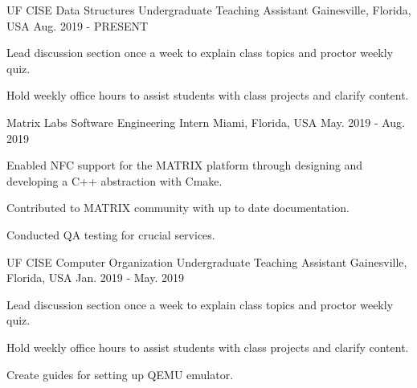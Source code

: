
\begin{cventries}

  \cventry
    {UF CISE} %
    {Data Structures Undergraduate Teaching Assistant} %
    {Gainesville, Florida, USA} %
    {Aug. 2019 - PRESENT} %
    {
      \begin{cvitems} %
        \item {Lead discussion section once a week to explain class topics and proctor weekly quiz.}
        \item {Hold weekly office hours to assist students with class projects and clarify content.}
      \end{cvitems}
    }


  \cventry
    {Matrix Labs} %
    {Software Engineering Intern} %
    {Miami, Florida, USA} %
    {May. 2019 - Aug. 2019} %
    {
      \begin{cvitems} %
        \item {Enabled NFC support for the MATRIX platform through designing and developing a C++ abstraction with Cmake.}
        \item {Contributed to MATRIX community with up to date documentation.}
        \item {Conducted QA testing for crucial services.}
      \end{cvitems}
    }


  \cventry
    {UF CISE} %
    {Computer Organization Undergraduate Teaching Assistant} %
    {Gainesville, Florida, USA} %
    {Jan. 2019 - May. 2019} %
    {
      \begin{cvitems} %
        \item {Lead discussion section once a week to explain class topics and proctor weekly quiz.}
        \item {Hold weekly office hours to assist students with class projects and clarify content.}
        \item {Create guides for setting up QEMU emulator.}
      \end{cvitems}
    }


\end{cventries}
